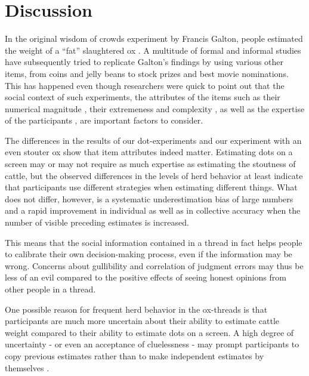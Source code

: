 \documentclass[10pt,a4paper,twocolumn,lineno]{article}
\begin{document}
\section{Discussion}
In the original wisdom of crowds experiment by Francis Galton, people estimated the weight of a “fat” slaughtered ox \cite{galton1907vox}. A multitude of formal and informal studies have subsequently tried to replicate Galton’s findings by using various other items, from coins and jelly beans to stock prizes and best movie nominations. This has happened even though researchers were quick to point out that the social context of such experiments, the attributes of the items such as their numerical magnitude \cite{izard2008calibrating, krueger1982single}, their extremeness and complexity \cite{nash2014curious, taleb2009errors}, as well as the expertise of the participants \cite{perry1907ballot}, are important factors to consider. 

The differences in the results of our dot-experiments and our experiment with an even stouter ox show that item attributes indeed matter. Estimating dots on a screen may or may not require as much expertise as estimating the stoutness of cattle, but the observed differences in the levels of herd behavior at least indicate that participants use different strategies when estimating different things. What does not differ, however, is a systematic underestimation bias of large numbers and a rapid improvement in individual as well as in collective accuracy when the number of visible preceding estimates is increased. 

This means that the social information contained in a thread in fact helps people to calibrate their own decision-making process, even if the information may be wrong. Concerns about gullibility and correlation of judgment errors may thus be less of an evil compared to the positive effects of seeing honest opinions from other people in a thread.

One possible reason for frequent herd behavior in the ox-threads is that participants are much more uncertain about their ability to estimate cattle weight compared to their ability to estimate dots on a screen. A high degree of uncertainty - or even an acceptance of cluelessness - may prompt participants to copy previous estimates rather than to make independent estimates by themselves \cite{navajas2018diversity}. 
\end{document}
